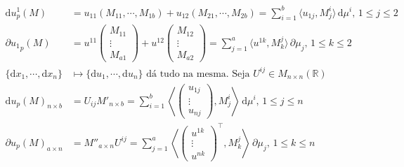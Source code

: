 \documentclass[12pt]{article}
\begin{document}
\begin{align}
  \mathrm{d}u^1_p(M) &= u_{11} (M_{11}, \cdots, M_{1b}) + u_{12} (M_{21}, \cdots, M_{2b}) = \sum_{i = 1}^b \langle u_{1j}, M^i_j \rangle\, \mathrm{d}\mu^i,\,1 \le j \le 2 \\
  \partial {u_1}_p(M) &= u^{11} \left( \begin{matrix} M_{11} \\ \vdots \\ M_{a1} \end{matrix} \right) + u^{12} \left( \begin{matrix} M_{12} \\ \vdots \\ M_{a2} \end{matrix} \right) = \sum_{j = 1}^a \langle u^{1k}, M^j_k \rangle\, \partial \mu_j,\,1 \le k \le 2 \\
  \{ \mathrm{d}x_1, \cdots, \mathrm{d}x_n \} &\mapsto \{ \mathrm{d}u_1, \cdots, \mathrm{d}u_n \} \text{ d\'a tudo na mesma. Seja } U^{ij} \in M_{n \times n}(\mathbb{R}) \\
  \mathrm{d}u_p(M)_{n \times b} &= U_{ij} M'_{n \times b} =  \sum_{i = 1}^b \left\langle \left( \begin{matrix} u_{1j} \\ \vdots \\ u_{nj} \end{matrix} \right), M^i_j \right\rangle\, \mathrm{d}\mu^i,\,1 \le j \le n \\
  \partial u_p(M)_{a \times n} &= M''_{a \times n} U^{ij} = \sum_{j = 1}^a \left\langle \left( \begin{matrix} u^{1k} \\ \vdots \\ u^{nk} \end{matrix} \right)^\top, M^j_k \right\rangle\, \partial \mu_j,\,1 \le k \le n
\end{align}
\end{document}
